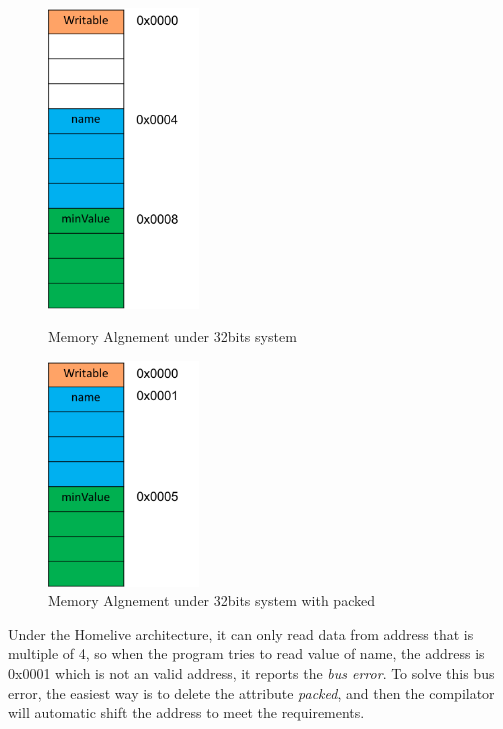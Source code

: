 \begin{figure}
\begin{minipage}[t]{0.5\linewidth}
\centering
\includegraphics[width=4cm]{Figures/alignement1.png}
\caption{Memory Algnement under 32bits system}
\label{fig:side:a}
\end{minipage}%
\begin{minipage}[t]{0.5\linewidth}
\centering
\includegraphics[width=4cm]{Figures/alignement2.png}
\caption{Memory Algnement under 32bits system with packed}
\label{fig:side:b}
\end{minipage}
\end{figure}


Under the Homelive architecture, it can only read data from address that is multiple of 4, so when the program tries to read value of name, the address is 0x0001 which is not an valid address, it reports the \textit{bus error}. To solve this bus error, the easiest way is to delete the attribute \textit{packed}, and then the compilator will automatic shift the address to meet the requirements.

